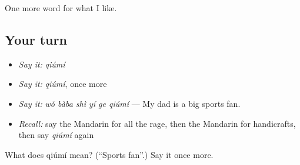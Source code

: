 \begin{grammarlens}[title={What you've built}]
One more word for what I like.
\end{grammarlens}

\subsection*{Your turn}
\begin{itemize}
\raggedright
  \item \emph{Say it:} \emph{qiúmí}
  \item \emph{Say it:} \emph{qiúmí}, once more
  \item \emph{Say it:} \emph{wǒ bàba shì yí ge qiúmí} — My dad is a big sports fan.
  \item \emph{Recall:} say the Mandarin for all the rage, then the Mandarin for handicrafts, then say \emph{qiúmí} again
\end{itemize}

\begin{tcolorbox}[breakable,colback=teal!4,colframe=teal!35!black,title={Before you move on}]
What does qiúmí mean? (\textquotedblleft{}Sports fan\textquotedblright{}.) Say it once more.
\end{tcolorbox}
